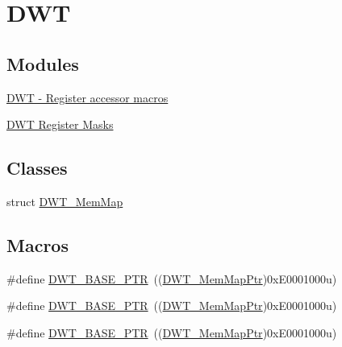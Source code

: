 \hypertarget{group___d_w_t___peripheral}{}\section{D\+WT}
\label{group___d_w_t___peripheral}
\subsection*{Modules}
\begin{DoxyCompactItemize}
\item 
\hyperlink{group___d_w_t___register___accessor___macros}{D\+W\+T -\/ Register accessor macros}
\item 
\hyperlink{group___d_w_t___register___masks}{D\+W\+T Register Masks}
\end{DoxyCompactItemize}
\subsection*{Classes}
\begin{DoxyCompactItemize}
\item 
struct \hyperlink{struct_d_w_t___mem_map}{D\+W\+T\+\_\+\+Mem\+Map}
\end{DoxyCompactItemize}
\subsection*{Macros}
\begin{DoxyCompactItemize}
\item 
\#define \hyperlink{group___d_w_t___peripheral_ga3b46dfb2ea7946c6938028d879c82cb1}{D\+W\+T\+\_\+\+B\+A\+S\+E\+\_\+\+P\+TR}~((\hyperlink{group___d_w_t___peripheral_ga8a09a1b28d871c18ae8c69f67af6d573}{D\+W\+T\+\_\+\+Mem\+Map\+Ptr})0x\+E0001000u)
\item 
\#define \hyperlink{group___d_w_t___peripheral_ga3b46dfb2ea7946c6938028d879c82cb1}{D\+W\+T\+\_\+\+B\+A\+S\+E\+\_\+\+P\+TR}~((\hyperlink{group___d_w_t___peripheral_ga8a09a1b28d871c18ae8c69f67af6d573}{D\+W\+T\+\_\+\+Mem\+Map\+Ptr})0x\+E0001000u)
\item 
\#define \hyperlink{group___d_w_t___peripheral_ga3b46dfb2ea7946c6938028d879c82cb1}{D\+W\+T\+\_\+\+B\+A\+S\+E\+\_\+\+P\+TR}~((\hyperlink{group___d_w_t___peripheral_ga8a09a1b28d871c18ae8c69f67af6d573}{D\+W\+T\+\_\+\+Mem\+Map\+Ptr})0x\+E0001000u)
\end{DoxyCompactItemize}

